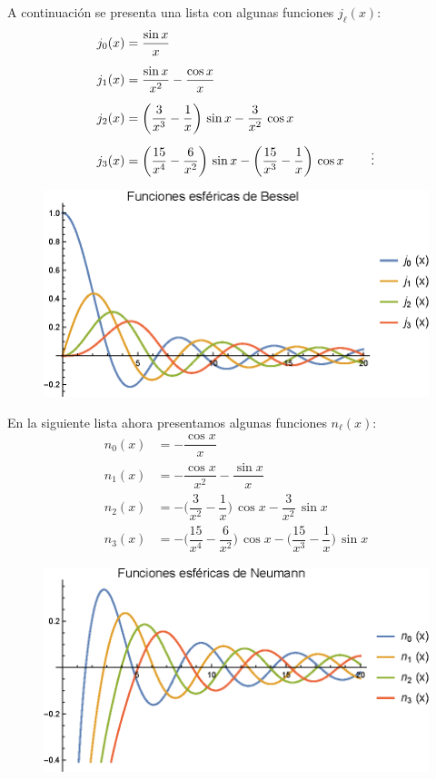 A continuación se presenta una lista con algunas funciones $j_{\ell} (x)$:
\begin{align*}
j_{0} (x) &= \dfrac{\sin x}{x} \\[0.5em]
j_{1} (x) &= \dfrac{\sin x}{x^{2}} - \dfrac{\cos x}{x} \\[0.5em]
j_{2} (x) &= \bigg( \dfrac{3}{x^{3}} - \dfrac{1}{x} \bigg) \, \sin x - \dfrac{3}{x^{2}} \, \cos x \\[0.5em]
j_{3} (x) &= \bigg( \dfrac{15}{x^{4}} - \dfrac{6}{x^{2}} \bigg) \, \sin x - \bigg( \dfrac{15}{x^{3}} - \dfrac{1}{x} \bigg) \, \cos x 
\hspace{0.4cm} &\vdots
\end{align*}
\begin{figure}[H]
    \centering
    \includegraphics[scale=1]{Imagenes/Plot_Esfericas_Bessel.eps}
\end{figure}

En la siguiente lista ahora presentamos algunas funciones $n_{\ell} (x)$:
\begin{align*}
n_{0} (x) &= - \dfrac{\cos x}{x} \\[0.5em]
n_{1} (x) &= - \dfrac{\cos x}{x^{2}} - \dfrac{\sin x}{x} \\[0.5em]
n_{2} (x) &= - \bigg( \dfrac{3}{x^{2}} - \dfrac{1}{x} \bigg) \, \cos x - \dfrac{3}{x^{2}} \, \sin x \\[0.5em]
n_{3} (x) &= - \bigg( \dfrac{15}{x^{4}} - \dfrac{6}{x^{2}} \bigg) \, \cos x - \bigg( \dfrac{15}{x^{3}} - \dfrac{1}{x} \bigg) \, \sin x
\end{align*}
\begin{figure}[H]
    \centering
    \includegraphics[scale=1]{Imagenes/Plot_Esfericas_Neumann.eps}
\end{figure}
